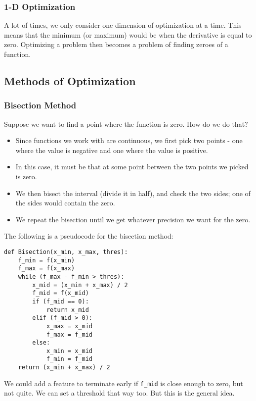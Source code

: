 \documentclass[10pt]{article}
\begin{document}
\subsubsection*{1-D Optimization}
A lot of times, we only consider one dimension of optimization at a time.  This means that the minimum (or maximum) would be when the derivative is equal to zero.  Optimizing a problem then becomes a problem of finding zeroes of a function.

\subsection*{Methods of Optimization}

\subsubsection*{Bisection Method}
Suppose we want to find a point where the function is zero.  How do we do that?
\begin{itemize}
	\item Since functions we work with are continuous, we first pick two points - one where the value is negative and one where the value is positive.
	\item In this case, it must be that at some point between the two points we picked is zero.
	\item We then bisect the interval (divide it in half), and check the two sides; one of the sides would contain the zero.
	\item We repeat the bisection until we get whatever precision we want for the zero.
\end{itemize}
The following is a pseudocode for the bisection method:
\begin{verbatim}
def Bisection(x_min, x_max, thres):
    f_min = f(x_min)
    f_max = f(x_max)
    while (f_max - f_min > thres):
        x_mid = (x_min + x_max) / 2
        f_mid = f(x_mid)
        if (f_mid == 0):
            return x_mid
        elif (f_mid > 0):
            x_max = x_mid
            f_max = f_mid
        else:
            x_min = x_mid
            f_min = f_mid
    return (x_min + x_max) / 2
\end{verbatim}
We could add a feature to terminate early if \texttt{f\_mid} is close enough to zero, but not quite.  We can set a threshold that way too.  But this is the general idea.
\end{document}
